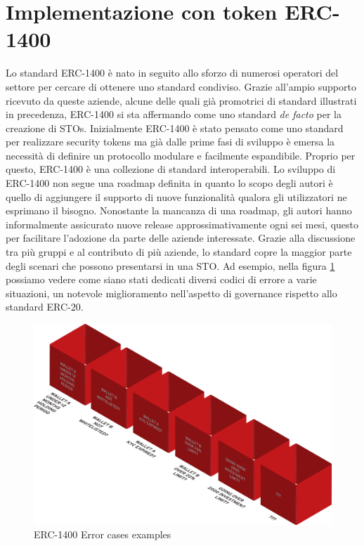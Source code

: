 \section{Implementazione con token ERC-1400}
Lo standard ERC-1400 è nato in seguito allo sforzo di numerosi operatori del settore per cercare di ottenere uno standard condiviso. Grazie all'ampio supporto ricevuto da queste aziende, alcune delle quali già promotrici di standard illustrati in precedenza, ERC-1400 si sta affermando come uno standard \textit{de facto} per la creazione di STOs.
Inizialmente ERC-1400 è stato pensato come uno standard per realizzare security tokens ma già dalle prime fasi di sviluppo è emersa la necessità di definire un protocollo modulare e facilmente espandibile. Proprio per questo, ERC-1400 è una collezione di standard interoperabili. Lo sviluppo di ERC-1400 non segue una roadmap definita in quanto lo scopo degli autori è quello di aggiungere il supporto di nuove funzionalità qualora gli utilizzatori ne esprimano il bisogno. Nonostante la mancanza di una roadmap, gli autori hanno informalmente assicurato nuove release approssimativamente ogni sei mesi, questo per facilitare l'adozione da parte delle aziende interessate.  
Grazie alla discussione tra più gruppi e al contributo di più aziende, lo standard copre la maggior parte degli scenari che possono presentarsi in una STO. Ad esempio, nella figura \ref{fig:1400} possiamo vedere come siano stati dedicati diversi codici di errore a varie situazioni, un notevole miglioramento nell'aspetto di governance rispetto allo standard ERC-20. 
\begin{figure}[H]
  \includegraphics[width=\linewidth]{1400.png}
  \caption{ERC-1400 Error cases examples}
  \label{fig:1400}
\end{figure}

